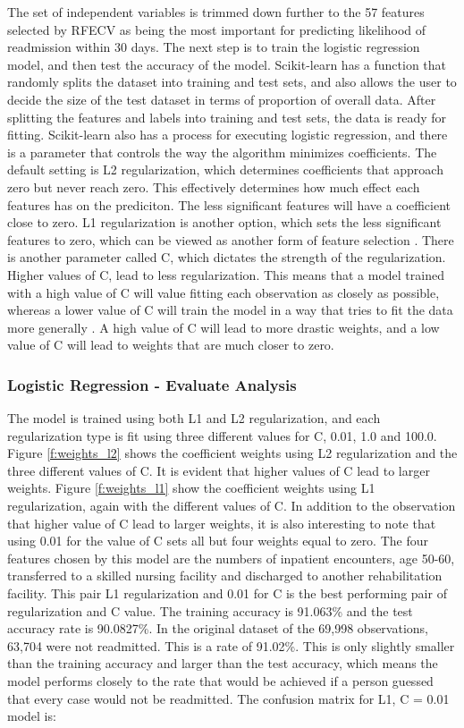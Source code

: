 \documentclass[sigconf]{acmart}
\begin{document}
The set of independent variables is trimmed down further to the 57 features selected by RFECV as being the most important for predicting likelihood of readmission within 30 days. The next step is to train the logistic regression model, and then test the accuracy of the model. Scikit-learn has a function that randomly splits the dataset into training and test sets, and also allows the user to decide the size of the test dataset in terms of proportion of overall data. After splitting the features and labels into training and test sets, the data is ready for fitting.
Scikit-learn also has a process for executing logistic regression, and there is a parameter that controls the way the algorithm minimizes coefficients. The default setting is L2 regularization, which determines coefficients that approach zero but never reach zero. This effectively determines how much effect each features has on the prediciton. The less significant features will have a coefficient close to zero. L1 regularization is another option, which sets the less significant features to zero, which can be viewed as another form of feature selection \cite{cite08}.
There is another parameter called C, which dictates the strength of the regularization. Higher values of C, lead to less regularization. This means that a model trained with a high value of C will value fitting each observation as closely as possible, whereas a lower value of C will train the model in a way that tries to fit the data more generally \cite{cite08}. A high value of C will lead to more drastic weights, and a low value of C will lead to weights that are much closer to zero.

\subsubsection{Logistic Regression - Evaluate Analysis}

The model is trained using both L1 and L2 regularization, and each regularization type is fit using three different values for C, 0.01, 1.0 and 100.0. Figure \ref{f:weights_l2} shows the coefficient weights using L2 regularization and the three different values of C. It is evident that higher values of C lead to larger weights. Figure \ref{f:weights_l1} show the coefficient weights using L1 regularization, again with the different values of C. In addition to the observation that higher value of C lead to larger weights, it is also interesting to note that using 0.01 for the value of C sets all but four weights equal to zero. The four features chosen by this model are the numbers of inpatient encounters, age 50-60, transferred to a skilled nursing facility and discharged to another rehabilitation facility. This pair L1 regularization and 0.01 for C is the best performing pair of regularization and C value. The training accuracy is 91.063\% and the test accuracy rate is 90.0827\%. In the original dataset of the 69,998 observations, 63,704 were not readmitted. This is a rate of 91.02\%. This is only slightly smaller than the training accuracy and larger than the test accuracy, which means the model performs closely to the rate that would be achieved if a person guessed that every case would not be readmitted.
The confusion matrix for L1, C = 0.01 model is:
\end{document}
